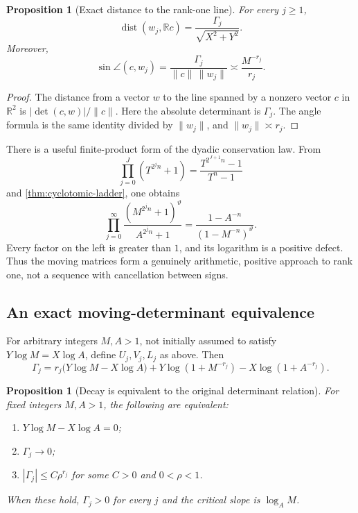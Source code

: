 \documentclass[11pt]{article}
\newtheorem{proposition}[theorem]{Proposition}
\theoremstyle{definition}
\newcommand{\R}{\mathbb R}
\newcommand{\dist}{\operatorname{dist}}
\newcommand{\vtheta}{\vartheta}
\begin{document}
\begin{proposition}[Exact distance to the rank-one line]\label{prop:distance-line}
For every $j\ge1$,
\begin{equation}\label{eq:distance-line}
 \dist(w_j,\R c)=\frac{\Gamma_j}{\sqrt{X^2+Y^2}}.
\end{equation}
Moreover,
\begin{equation}\label{eq:angle-asymp}
 \sin\angle(c,w_j)
 =\frac{\Gamma_j}{\|c\|\,\|w_j\|}
 \asymp\frac{M^{-r_j}}{r_j}.
\end{equation}
\end{proposition}

\begin{proof}
The distance from a vector $w$ to the line spanned by a nonzero vector $c$ in
$\R^2$ is $|\det(c,w)|/\|c\|$.  Here the absolute determinant is $\Gamma_j$.
The angle formula is the same identity divided by $\|w_j\|$, and
$\|w_j\|\asymp r_j$.
\end{proof}

There is a useful finite-product form of the dyadic conservation law.  From
\[
 \prod_{j=0}^{J}(T^{2^jn}+1)=\frac{T^{2^{J+1}n}-1}{T^n-1}
\]
and \cref{thm:cyclotomic-ladder}, one obtains
\begin{equation}\label{eq:dyadic-product}
 \prod_{j=0}^{\infty}
 \frac{(M^{2^jn}+1)^{\vtheta}}{A^{2^jn}+1}
 =\frac{1-A^{-n}}{(1-M^{-n})^{\vtheta}}.
\end{equation}
Every factor on the left is greater than $1$, and its logarithm is a positive defect.
Thus the moving matrices form a genuinely arithmetic, positive approach to rank one,
not a sequence with cancellation between signs.

\subsection{An exact moving-determinant equivalence}

For arbitrary integers $M,A>1$, not initially assumed to satisfy
$Y\log M=X\log A$, define $U_j,V_j,L_j$ as above.  Then
\begin{equation}\label{eq:general-Gamma}
 \Gamma_j
 =r_j\bigl(Y\log M-X\log A\bigr)
 +Y\log(1+M^{-r_j})-X\log(1+A^{-r_j}).
\end{equation}

\begin{proposition}[Decay is equivalent to the original determinant relation]
\label{prop:decay-equivalent}
For fixed integers $M,A>1$, the following are equivalent:
\begin{enumerate}[label=\textup{(\alph*)}]
\item $Y\log M-X\log A=0$;
\item $\Gamma_j\to0$;
\item $|\Gamma_j|\le C\rho^{r_j}$ for some $C>0$ and $0<\rho<1$.
\end{enumerate}
When these hold, $\Gamma_j>0$ for every $j$ and the critical slope is
$\log_A M$.
\end{proposition}
\end{document}

